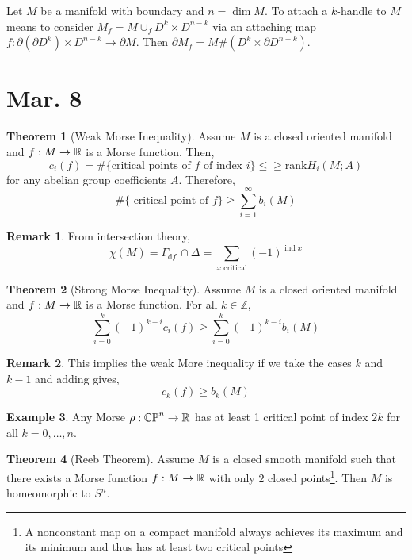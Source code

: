 \documentclass[12pt]{extarticle}
\newcommand{\Z}{\mathbb{Z}}
\renewcommand{\d}[1]{ \mathrm{d}#1 \:}
\DeclareMathOperator{\ind}{\mathrm{ind}}
\theoremstyle{definition}
\newtheorem{theorem}{Theorem}[section]
\newtheorem{example}[theorem]{Example}
\newtheorem{remark}{Remark}
\newenvironment{definition}[1][Definition:]{\begin{trivlist}
\item[\hskip \labelsep {\bfseries #1}]}{\end{trivlist}}
\begin{document}
\begin{definition}
Let $M$ be a manifold with boundary and $n = \dim{M}$. To attach a $k$-handle to $M$ means to consider $M_f = M \cup_f D^k \times D^{n-k}$ via an attaching map $f : \partial (\partial D^k) \times D^{n-k} \to \partial M$. Then $\partial M_f = M \# (D^k \times \partial D^{n-k})$.
\end{definition}


\section{Mar. 8}

\begin{theorem}[Weak Morse Inequality]
Assume $M$ is a closed oriented manifold and $f : M \to \mathbb{R}$ is a Morse function. Then,
\[ c_i(f) = \# \{ \text{critical points of } f \text{ of index } i \} \le \ge \mathrm{rank} H_i(M ; A) \]
for any abelian group coefficients $A$. Therefore,
\[ \# \{ \text{ critical point of } f \} \ge \sum_{i = 1}^\infty b_i(M) \]
\end{theorem}

\begin{remark}
From intersection theory,
\[ \chi(M) = \Gamma_{\d{f}} \cap \Delta = \sum_{x \text{ critical}} (-1)^{\ind{x}} \]
\end{remark}

\begin{theorem}[Strong Morse Inequality]
Assume $M$ is a closed oriented manifold and $f : M \to \mathbb{R}$ is a Morse function. For all $k \in \Z$,
\[ \sum_{i = 0}^k (-1)^{k-i} c_i(f) \ge \sum_{i = 0}^k (-1)^{k-i} b_i(M) \]
\end{theorem}

\begin{remark}
This implies the weak More inequality if we take the cases $k$ and $k-1$ and adding gives,
\[ c_k(f) \ge b_k(M) \]
\end{remark}

\newcommand{\CP}{\mathbb{CP}}

\begin{example}
Any Morse $\rho : \CP^n \to \RR$ has at least 1 critical point of index $2k$ for all $k = 0, \dots, n$.  
\end{example}

\begin{theorem}[Reeb Theorem]
Assume $M$ is a closed smooth manifold such that there exists a Morse function $f : M \to \mathbb{R}$ with only $2$ closed points\footnote{A nonconstant map on a compact manifold always achieves its maximum and its minimum and thus has at least two critical points}. Then $M$ is homeomorphic to $S^n$.
\end{theorem}
\end{document}
